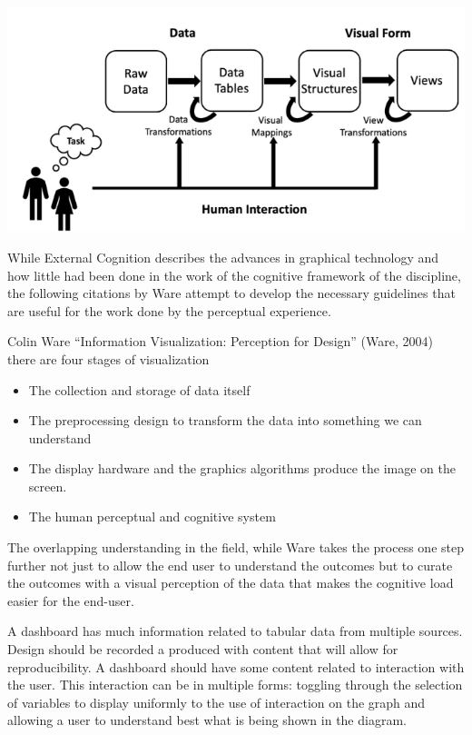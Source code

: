 \documentclass[print]{nuthesis}
\providecommand{\tightlist}{%
  \setlength{\itemsep}{0pt}\setlength{\parskip}{0pt}}
\begin{document}
\begin{center}
\includegraphics[width=\textwidth]{figure/VizModelDiagram}
\end{center}

While External Cognition describes the advances in graphical technology and how little had been done in the work of the cognitive framework of the discipline, the following citations by Ware attempt to develop the necessary guidelines that are useful for the work done by the perceptual experience.

Colin Ware ``Information Visualization: Perception for Design'' (Ware, 2004) there are four stages of visualization

\begin{itemize}
\tightlist
\item
  The collection and storage of data itself
\item
  The preprocessing design to transform the data into something we can understand
\item
  The display hardware and the graphics algorithms produce the image on the screen.
\item
  The human perceptual and cognitive system
\end{itemize}

The overlapping understanding in the field, while Ware takes the process one step further not just to allow the end user to understand the outcomes but to curate the outcomes with a visual perception of the data that makes the cognitive load easier for the end-user.

A dashboard has much information related to tabular data from multiple sources. Design should be recorded a produced with content that will allow for reproducibility. A dashboard should have some content related to interaction with the user. This interaction can be in multiple forms: toggling through the selection of variables to display uniformly to the use of interaction on the graph and allowing a user to understand best what is being shown in the diagram.
\end{document}
